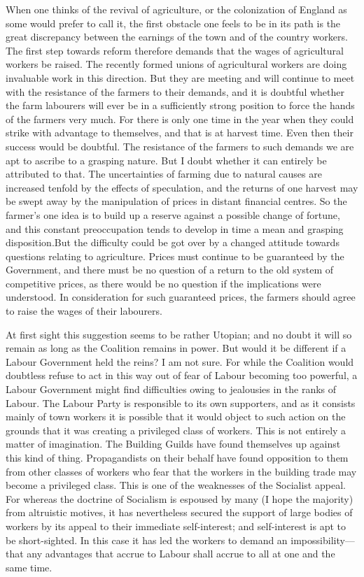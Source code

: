 \documentclass{book}
\begin{document}
When one thinks of the revival of agriculture, or the colonization of England as some would prefer to call it, the first obstacle one feels to be in its path is the great discrepancy between the earnings of the town and of the country workers. The first step towards reform therefore demands that the wages of agricultural workers be raised. The recently formed unions of agricultural workers are doing invaluable work in this direction. But they are meeting and will continue to meet with the resistance of the farmers to their demands, and it is doubtful whether the farm labourers will ever be in a sufficiently strong position to force the hands of the farmers very much. For there is only one time in the year when they could strike with advantage to themselves, and that is at harvest time. Even then their success would be doubtful. The resistance of the farmers to such demands we are apt to ascribe to a grasping nature. But I doubt whether it can entirely be attributed to that. The uncertainties of farming due to natural causes are increased tenfold by the effects of speculation, and the returns of one harvest may be swept away by the manipulation of prices in distant financial centres. So the farmer’s one idea is to build up a reserve against a possible change of fortune, and this constant preoccupation tends to develop in time a mean and grasping disposition.\footnotemark[1] But the difficulty could be got over by a changed attitude towards questions relating to agriculture. Prices must continue to be guaranteed by the Government, and there must be no question of a return to the old system of competitive prices, as there would be no question if the implications were understood. In consideration for such guaranteed prices, the farmers should agree to raise the wages of their labourers.

At first sight this suggestion seems to be rather Utopian; and no doubt it will so remain as long as the Coalition remains in power. But would it be different if a Labour Government held the reins? I am not sure. For while the Coalition would doubtless refuse to act in this way out of fear of Labour becoming too powerful, a Labour Government might find difficulties owing to jealousies in the ranks of Labour. The Labour Party is responsible to its own supporters, and as it consists mainly of town workers it is possible that it would object to such action on the grounds that it was creating a privileged class of workers. This is not entirely a matter of imagination. The Building Guilds have found themselves up against this kind of thing. Propagandists on their behalf have found opposition to them from other classes of workers who fear that the workers in the building trade may become a privileged class. This is one of the weaknesses of the Socialist appeal. For whereas the doctrine of Socialism is espoused by many (I hope the majority) from altruistic motives, it has nevertheless secured the support of large bodies of workers by its appeal to their immediate self-interest; and self-interest is apt to be short-sighted. In this case it has led the workers to demand an impossibility—that any advantages that accrue to Labour shall accrue to all at one and the same time.
\end{document}
